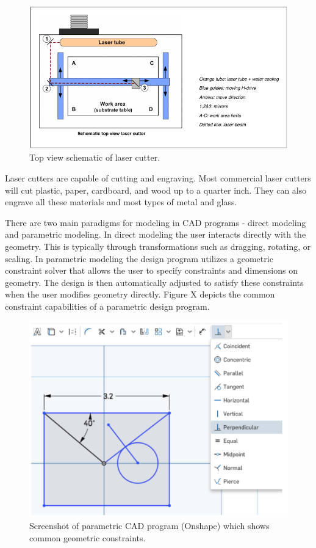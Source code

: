 \begin{figure}[h]
  \includegraphics[width=\linewidth]{lasersystem.jpg}
  \caption{Top view schematic of laser cutter.}
  \label{fig:lasersystem}
\end{figure}

Laser cutters are capable of cutting and engraving. Most commercial laser cutters will cut plastic, paper, cardboard, and wood up to a quarter inch. They can also engrave all these materials and most types of metal and glass.

There are two main paradigms for modeling in CAD programs - direct modeling and parametric modeling. In direct modeling the user interacts directly with the geometry. This is typically through transformations such as dragging, rotating, or scaling. In parametric modeling the design program utilizes a geometric constraint solver that allows the user to specify constraints and dimensions on geometry. The design is then automatically adjusted to satisfy these constraints when the user modifies geometry directly. Figure X depicts the common constraint capabilities of a parametric design program.

\begin{figure}[h]
  \includegraphics[width=\linewidth]{parametricProgram.jpg}
  \caption{Screenshot of parametric CAD program (Onshape) which shows common geometric constraints.}
  \label{fig:parametricProgram}
\end{figure}

